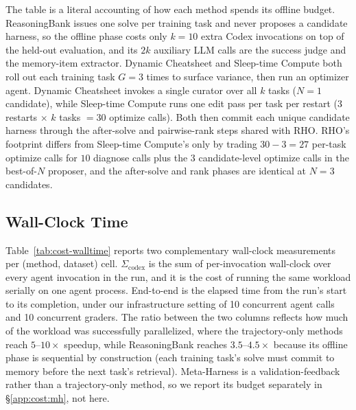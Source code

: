 \documentclass{llmxive}
\providecommand{\method}{\textsc{RHO}}
\begin{document}
 The table is a literal accounting of how each method spends its offline budget.
ReasoningBank issues one solve per training task and never proposes a candidate harness, so the offline phase costs only $k=10$ extra Codex invocations on top of the held-out evaluation, and its $2k$ auxiliary LLM calls are the success judge and the memory-item extractor.
Dynamic Cheatsheet and Sleep-time Compute both roll out each training task $G=3$ times to surface variance, then run an optimizer agent. Dynamic Cheatsheet invokes a single curator over all $k$ tasks ($N{=}1$ candidate), while Sleep-time Compute runs one edit pass per task per restart (3 restarts $\times$ $k$ tasks $=30$ optimize calls).
Both then commit each unique candidate harness through the after-solve and pairwise-rank steps shared with \method{}.
\method{}'s footprint differs from Sleep-time Compute's only by trading $30-3=27$ per-task optimize calls for $10$ diagnose calls plus the $3$ candidate-level optimize calls in the best-of-$N$ proposer, and the after-solve and rank phases are identical at $N=3$ candidates.

\subsection{Wall-Clock Time}

 Table~\ref{tab:cost-walltime} reports two complementary wall-clock measurements per (method, dataset) cell.
$\Sigma_{\mathrm{codex}}$ is the sum of per-invocation wall-clock over every agent invocation in the run, and it is the cost of running the same workload serially on one agent process.
End-to-end is the elapsed time from the run's start to its completion, under our infrastructure setting of 10 concurrent agent calls and 10 concurrent graders.
The ratio between the two columns reflects how much of the workload was successfully parallelized, where the trajectory-only methods reach $5$--$10\times$ speedup, while ReasoningBank reaches $3.5$--$4.5\times$ because its offline phase is sequential by construction (each training task's solve must commit to memory before the next task's retrieval).
Meta-Harness is a validation-feedback rather than a trajectory-only method, so we report its budget separately in \S\ref{app:cost:mh}, not here.
\end{document}
